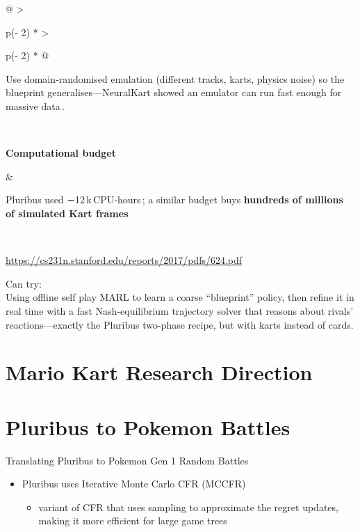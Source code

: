 \documentclass[
]{article}
\begin{document}
\begin{longtable}[]{@{}
  >{\raggedright\arraybackslash}p{(\columnwidth - 2\tabcolsep) * }
  >{\raggedright\arraybackslash}p{(\columnwidth - 2\tabcolsep) * }@{}}
\begin{minipage}[b]{\linewidth}
Use domain‑randomised emulation (different tracks, karts, physics noise)
so the blueprint generalises---NeuralKart showed an emulator can run
fast enough for massive data\,.
\end{minipage} \\
\begin{minipage}[b]{\linewidth}\raggedright
\textbf{Computational budget}
\end{minipage} & \begin{minipage}[b]{\linewidth}\raggedright
Pluribus used ∼12\,k\,CPU‑hours\,; a similar budget buys
\textbf{hundreds of millions of simulated Kart frames}
\end{minipage} \\
\midrule\noalign{}
\endhead
\bottomrule\noalign{}
\endlastfoot
\end{longtable}

\href{https://cs231n.stanford.edu/reports/2017/pdfs/624.pdf}{\ul{https://cs231n.stanford.edu/reports/2017/pdfs/624.pdf}}

Can try:\\
Using offline self play MARL to learn a coarse ``blueprint'' policy,
then refine it in real time with a fast Nash‑equilibrium trajectory
solver that reasons about rivals' reactions---exactly the Pluribus
two‑phase recipe, but with karts instead of cards.

\section*{Mario Kart Research
Direction}\label{mario-kart-research-direction}

\section*{Pluribus to Pokemon
Battles}\label{pluribus-to-pokemon-battles}

Translating Pluribus to Pokemon Gen 1 Random Battles

\begin{itemize}
\item
  Pluribus uses Iterative Monte Carlo CFR (MCCFR)

  \begin{itemize}
  \item
    variant of CFR that uses sampling to approximate the regret updates,
    making it more efficient for large game trees
  \end{itemize}
\end{itemize}
\end{document}
